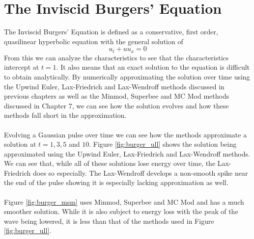 \chapter{The Inviscid Burgers' Equation}
The Inviscid Burgers' Equation is defined as a conservative, first order, quasilinear hyperbolic equation with the general solution of
\begin{equation}\label{eq:burgers}
  u_t + uu_x = 0
\end{equation}
From this we can analyze the characteristics to see that the characteristics intercept at $t=1$. It also means that an exact solution to the equation is difficult to obtain analytically. By numerically approximating the solution over time using the Upwind Euler, Lax-Friedrich and Lax-Wendroff methods discussed in previous chapters as well as the Minmod, Superbee and MC Mod methods discussed in Chapter 7, we can see how the solution evolves and how these methods fall short in the approximation.
\\
\\
Evolving a Gaussian pulse over time we can see how the methods approximate a solution at $t=1,3,5$ and $10$. Figure \ref{fig:burger_ull} shows the solution being approximated using the Upwind Euler, Lax-Friedrich and Lax-Wendroff methods. We can see that, while all of these solutions lose energy over time, the Lax-Friedrich does so especially. The Lax-Wendroff develops a non-smooth spike near the end of the pulse showing it is especially lacking approximation as well.
\\
\\
Figure \ref{fig:burger_msm} uses Minmod, Superbee and MC Mod and has a much smoother solution. While it is also subject to energy loss with the peak of the wave being lowered, it is less than that of the methods used in Figure \ref{fig:burger_ull}.

